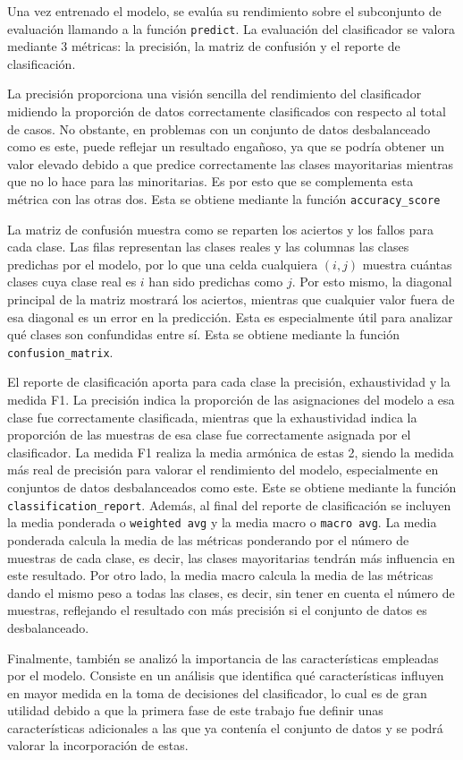 Una vez entrenado el modelo, se evalúa su rendimiento sobre el subconjunto de evaluación llamando a la función \texttt{predict}. La evaluación del clasificador se valora mediante 3 métricas: la precisión, la matriz de confusión y el reporte de clasificación.

La precisión proporciona una visión sencilla del rendimiento del clasificador midiendo la proporción de datos correctamente clasificados con respecto al total de casos. No obstante, en problemas con un conjunto de datos desbalanceado como es este, puede reflejar un resultado engañoso, ya que se podría obtener un valor elevado debido a que predice correctamente las clases mayoritarias mientras que no lo hace para las minoritarias. Es por esto que se complementa esta métrica con las otras dos. Esta se obtiene mediante la función \texttt{accuracy\_score}

La matriz de confusión muestra como se reparten los aciertos y los fallos para cada clase. Las filas representan las clases reales y las columnas las clases predichas por el modelo, por lo que una celda cualquiera $(i,j)$ muestra cuántas clases cuya clase real es $i$ han sido predichas como $j$. Por esto mismo, la diagonal principal de la matriz mostrará los aciertos, mientras que cualquier valor fuera de esa diagonal es un error en la predicción. Esta es especialmente útil para analizar qué clases son confundidas entre sí. Esta se obtiene mediante la función \texttt{confusion\_matrix}.

El reporte de clasificación aporta para cada clase la precisión, exhaustividad y la medida F1. La precisión indica la proporción de las asignaciones del modelo a esa clase fue correctamente clasificada, mientras que la exhaustividad indica la proporción de las muestras de esa clase fue correctamente asignada por el clasificador. La medida F1 realiza la media armónica de estas 2, siendo la medida más real de precisión para valorar el rendimiento del modelo, especialmente en conjuntos de datos desbalanceados como este. Este se obtiene mediante la función \texttt{classification\_report}. Además, al final del reporte de clasificación se incluyen la media ponderada o \texttt{weighted avg} y la media macro o \texttt{macro avg}. La media ponderada calcula la media de las métricas ponderando por el número de muestras de cada clase, es decir, las clases mayoritarias tendrán más influencia en este resultado. Por otro lado, la media macro calcula la media de las métricas dando el mismo peso a todas las clases, es decir, sin tener en cuenta el número de muestras, reflejando el resultado con más precisión si el conjunto de datos es desbalanceado.

Finalmente, también se analizó la importancia de las características empleadas por el modelo. Consiste en un análisis que identifica qué características influyen en mayor medida en la toma de decisiones del clasificador, lo cual es de gran utilidad debido a que la primera fase de este trabajo fue definir unas características adicionales a las que ya contenía el conjunto de datos y se podrá valorar la incorporación de estas.